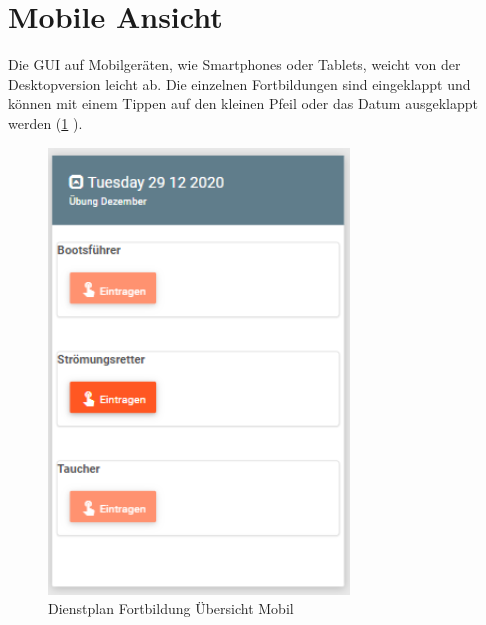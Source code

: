 \section{Mobile Ansicht}
\label{sec:training_mobile}
Die GUI auf Mobilgeräten, wie \zB Smartphones oder Tablets, weicht von der Desktopversion leicht ab. Die einzelnen Fortbildungen sind eingeklappt und können mit einem Tippen auf den kleinen Pfeil oder das Datum ausgeklappt werden (\ref{fig:view_training_mobile_close} \textit{}). 


\begin{figure}[h]
 \begin{addmargin}{-0.2\linewidth}
   \centering 
   \includegraphics[width=8cm]{Bilder/view_training_mobile.png}
 \end{addmargin} 
 \caption[Fortbildungen Übersicht Mobil]{Dienstplan Fortbildung Übersicht Mobil}
 \label{fig:view_training_mobile_close}
\end{figure}